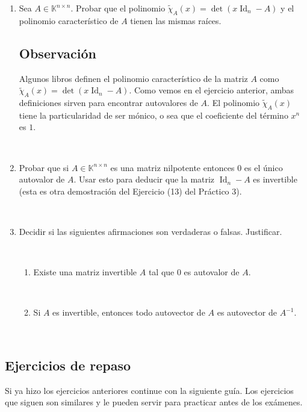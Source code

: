 \documentclass[12pt]{amsart}
\begin{document}
\begin{enumerate}
\item Sea $A\in\mathbb{K}^{n\times n}$. Probar que el polinomio $\tilde\chi_A(x)=\det(x\operatorname{Id}_n-A)$ y el polinomio \linebreak caracter\'istico de $A$ tienen las mismas ra\'ices.

\subsection*{Observaci\'{o}n} Algunos libros definen el polinomio caracter\'istico de la matriz $A$ como $\tilde\chi_A(x)=\det(x\operatorname{Id}_n-A)$. Como vemos en el ejercicio anterior, ambas definiciones sirven para encontrar autovalores de $A$. El polinomio $\tilde\chi_A(x)$ tiene la particularidad de ser m\'onico, o sea que el coeficiente del t\'ermino $x^n$ es $1$.

\

\item Probar que si $A\in\mathbb{K}^{n\times n}$ es una matriz nilpotente entonces $0$ es el \' unico autovalor de $A$. Usar esto para deducir que la matriz $\operatorname{Id}_n-A$ es invertible (esta es otra demostraci\'on del Ejercicio (13) del Pr\'actico 3).

\


\item Decidir si las siguientes afirmaciones son verdaderas o falsas. Justificar.

\

\begin{enumerate}
\item Existe una matriz invertible $A$ tal que $0$ es autovalor de $A$.

\

\item  Si $A$ es invertible, entonces todo autovector de $A$ es autovector de $A^{-1}$.

\end{enumerate}

\end{enumerate}

\

\subsection*{Ejercicios de repaso}
Si ya hizo los ejercicios anteriores continue con la siguiente gu\'ia. Los ejercicios que siguen son similares y le pueden servir para practicar antes de los ex\'amenes.

\
\end{document}
